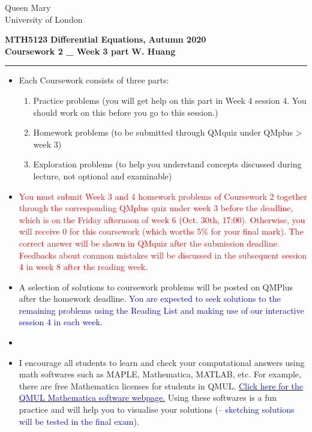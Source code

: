 \documentclass[11pt,a4paper,twoside]{article}
\begin{document}
	\begin{singlespace}
		\begin{center}
			\Huge Queen Mary\\
			\LARGE University of London
		\end{center}
		\Large \textbf{MTH5123} \hfill \Large \textbf{Differential Equations,} \hfill \Large \textbf{Autumn 2020}\\
		\large \textbf{Coursework 2 \_ Week 3 part} \hfill \large \textbf{W. Huang}
	\end{singlespace}
	\rule{\textwidth}{0.4pt}
	\begin{itemize}
		\item Each Coursework consists of three parts:
		\begin{enumerate}[\bfseries I.]
			\item Practice problems (you will get help on this part in Week 4 session 4. You should work on this before you go to this session.)
			\item Homework problems (to be submitted through QMquiz under QMplus > week 3)
			\item Exploration problems (to help you understand concepts discussed during lecture, not optional and examinable)
		\end{enumerate}
		\item \textcolor{red}{You must submit Week 3 and 4 homework problems of Coursework 2 together through the corresponding QMplus quiz under week 3 before the deadline, which is on the Friday afternoon of week 6 (Oct. 30th, 17:00). Otherwise, you will receive 0 for this coursework (which worths 5\% for your final mark). The correct answer will be shown in QMquiz after the submission deadline. Feedbacks about common mistakes will be discussed in the subsequent session 4 in week 8 after the reading week.}
		\item A selection of solutions to coursework problems will be posted on QMPlus after the homework deadline. \textcolor{blue}{You are expected to seek solutions to the remaining problems using the Reading List and making use of our interactive session 4 in each week.}
		\item \item I encourage all students to learn and check your computational answers using math softwares such as MAPLE, Mathematica, MATLAB, etc. For example, there are free Mathematica licenses for students in QMUL. \href{https://www.its.qmul.ac.uk/services/service-catalogue/items/software---computational-mathematica.html}{\textcolor{blue}{Click here for the QMUL Mathematica software webpage.}} Using these softwares is a fun practice and will help you to visualise your solutions (– \textcolor{blue}{sketching solutions will be tested in the final exam}).
	\end{itemize}
\end{document}
